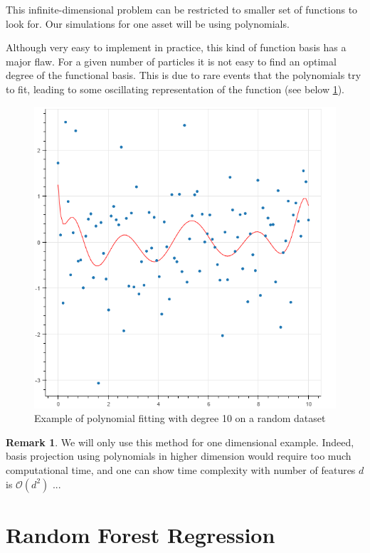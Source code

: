 \documentclass[english,11pt,openany]{report}
\theoremstyle{definition}
\newcommand{\bigO}{\mathcal{O}}
\theoremstyle{plain}
\theoremstyle{definition}
\newtheorem{Rem}[Th]{Remark}
\begin{document}
This infinite-dimensional problem can be restricted to smaller set of functions to look for. 
Our simulations for one asset will be using polynomials. 

Although very easy to implement in practice, this kind of function basis has a
major flaw. For a given number of particles it is not easy to find an optimal degree
of the functional basis. This is due to rare events that
the polynomials try to fit, leading to some oscillating representation of the function (see below \ref{fig:lsm_regression}). 


\begin{figure}[H]
	\centering
	\includegraphics[scale = 0.5]{polynomial.png}
	\caption{Example of polynomial fitting with degree 10 on a random dataset \label{fig:lsm_regression}}
	
\end{figure}

\begin{Rem}
	We will only use this method for one dimensional example. Indeed, basis projection using polynomials in higher dimension would require too much computational time, and one can show time complexity with number of features $d$ is $\bigO (d^2)$ ...
\end{Rem}

\section{Random Forest Regression}
\end{document}
